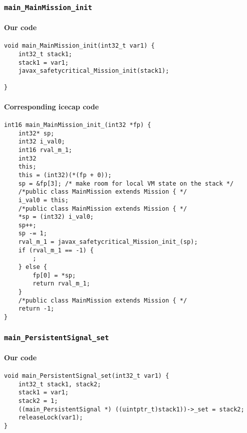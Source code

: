 \begin{landscape}
\begin{multicols}{2}
\subsubsection{\texttt{main\_MainMission\_init}}

\paragraph{Our code}\hfill
\begin{lstlisting}[firstnumber=1749]
void main_MainMission_init(int32_t var1) {
	int32_t stack1;
	stack1 = var1;
	javax_safetycritical_Mission_init(stack1);

}
\end{lstlisting}

\paragraph{Corresponding icecap code}\hfill
\begin{lstlisting}[firstnumber=53957]
int16 main_MainMission_init_(int32 *fp) {
	int32* sp;
	int32 i_val0;
	int16 rval_m_1;
	int32
	this;
	this = (int32)(*(fp + 0));
	sp = &fp[3]; /* make room for local VM state on the stack */
	/*public class MainMission extends Mission { */
	i_val0 = this;
	/*public class MainMission extends Mission { */
	*sp = (int32) i_val0;
	sp++;
	sp -= 1;
	rval_m_1 = javax_safetycritical_Mission_init_(sp);
	if (rval_m_1 == -1) {
		;
	} else {
		fp[0] = *sp;
		return rval_m_1;
	}
	/*public class MainMission extends Mission { */
	return -1;
}
\end{lstlisting}

\subsubsection{\texttt{main\_PersistentSignal\_set}}

\paragraph{Our code}\hfill
\begin{lstlisting}[firstnumber=1811]
void main_PersistentSignal_set(int32_t var1) {
	int32_t stack1, stack2;
	stack1 = var1;
	stack2 = 1;
	((main_PersistentSignal *) ((uintptr_t)stack1))->_set = stack2;
	releaseLock(var1);
}
\end{lstlisting}


\end{multicols}
\end{landscape}
